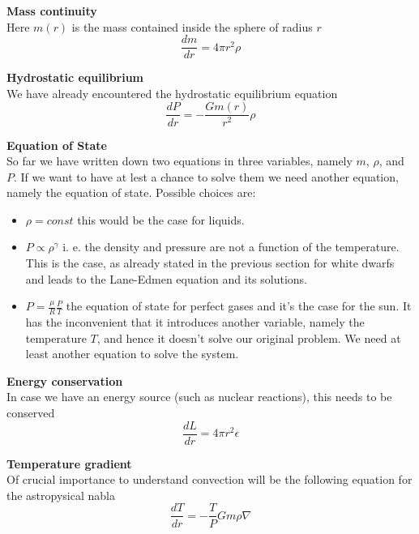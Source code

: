 \documentclass[11pt]{article}
\numberwithin{equation}{section}
\begin{document}
\textbf{Mass continuity} \\
Here $m(r)$ is the mass contained inside the sphere of radius $r$
\begin{equation}\label{masscons}
	\frac{dm}{dr}=4 \pi r^2 \rho
\end{equation}

\textbf{Hydrostatic equilibrium} \\
We have already encountered the hydrostatic equilibrium equation
\begin{equation}\label{hydroeq}
	\frac{dP}{dr}= - \frac{G m(r)}{r^2} \rho
\end{equation}

\textbf{Equation of State} \\
So far we have written down two equations in three variables, namely $m$, $\rho$, and $P$. If we want to have at lest a chance to solve them we need another equation, namely the equation of state. Possible choices are:
\begin{itemize}
	\item $\rho=const$ this would be the case for liquids.
	\item $P\propto \rho^\gamma$ i. e. the density and pressure are not a function of the temperature. This is the case, as already stated in the previous section for white dwarfs and leads to the Lane-Edmen equation and its solutions.
	\item $P=\frac{\mu}{R}\frac{P}{T}$ the equation of state for perfect gases and it's the case for the sun. It has the inconvenient that it introduces another variable, namely the temperature $T$, and hence it doesn't solve our original problem. We need at least another equation to solve the system. 
\end{itemize}

\textbf{Energy conservation} \\
In case we have an energy source (such as nuclear reactions), this needs to be conserved
\begin{equation}\label{energycons}
	\frac{dL}{dr} = 4 \pi r^2 \epsilon
\end{equation}

\textbf{Temperature gradient} \\
Of crucial importance to understand convection will be the following equation for the astropysical nabla
\begin{equation}\label{energytransfer}
\frac{d T}{d r} = - \frac{T }{P} G m \rho\nabla
\end{equation}
\end{document}

